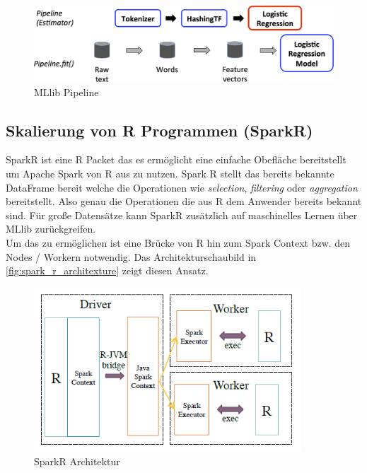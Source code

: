 \begin{figure}[h]
  \centering
  \includegraphics[width=\textwidth]{./bilder/ml-pipeline.png}
  \caption{MLlib Pipeline \cite{SPMLLIB}}\label{fig:spark_ml_pipeline}
\end{figure}






\newpage
\subsection{Skalierung von R Programmen (SparkR)}\label{sec_sparkr}

SparkR ist eine R Packet das es ermöglicht eine einfache Obefläche bereitstellt um Apache Spark von R aus zu nutzen. Spark R stellt das bereits bekannte DataFrame bereit welche die Operationen wie \textsl{selection}, \textsl{filtering} oder \textsl{aggregation} bereitstellt. Also genau die Operationen die aus R dem Anwender bereits bekannt sind. 
Für große Datensätze kann SparkR zusätzlich auf maschinelles Lernen über MLlib zurückgreifen. \\

\noindent
Um das zu ermöglichen ist eine Brücke von R hin zum Spark Context bzw. den Nodes / Workern notwendig. Das Architekturschaubild in \autoref{fig:spark_r_architexture} zeigt diesen Ansatz. 
\begin{figure}[h]
  \centering
  \includegraphics[width=100mm]{./bilder/spark_r_architecture.PNG}
  \caption{SparkR Architektur \cite{VYL+16}}\label{fig:spark_r_architexture}
\end{figure}

